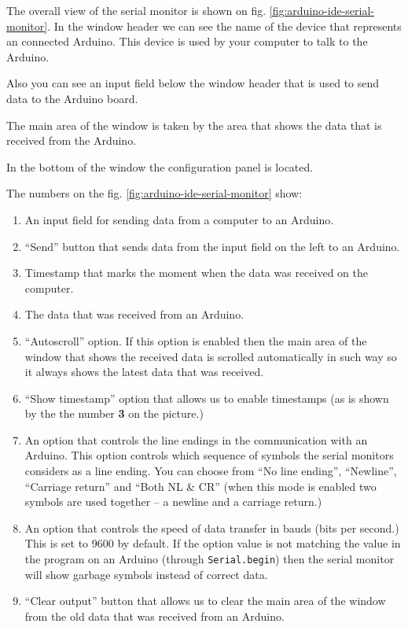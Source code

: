 \documentclass[../sparc.tex]{subfiles}
\begin{document}
The overall view of the serial monitor is shown on fig.
\ref{fig:arduino-ide-serial-monitor}.  In the window header we can see the name
of the device that represents an connected Arduino.  This device is used by your
computer to talk to the Arduino.

Also you can see an input field below the window header that is used to send
data to the Arduino board.

The main area of the window is taken by the area that shows the data that is
received from the Arduino.

In the bottom of the window the configuration panel is located.

The numbers on the fig. \ref{fig:arduino-ide-serial-monitor} show:
\begin{enumerate}
\item An input field for sending data from a computer to an Arduino.
\item ``Send'' button that sends data from the input field on the left to an
  Arduino.
\item Timestamp that marks the moment when the data was received on the
  computer.
\item The data that was received from an Arduino.
\item ``Autoscroll'' option.  If this option is enabled then the main area of
  the window that shows the received data is scrolled automatically in such way
  so it always shows the latest data that was received.
\item ``Show timestamp'' option that allows us to enable timestamps (as is shown
  by the the number \textbf{3} on the picture.)
\item An option that controls the line endings in the communication with an
  Arduino.  This option controls which sequence of symbols the serial monitors
  considers as a line ending.  You can choose from ``No line ending'',
  ``Newline'', ``Carriage return'' and ``Both NL \& CR'' (when this mode is
  enabled two symbols are used together -- a newline and a carriage return.)
\item An option that controls the speed of data transfer in bauds (bits per
  second.)  This is set to 9600 by default.  If the option value is not matching
  the value in the program on an Arduino (through \texttt{Serial.begin}) then
  the serial monitor will show garbage symbols instead of correct data.
\item ``Clear output'' button that allows us to clear the main area of the
  window from the old data that was received from an Arduino.
\end{enumerate}
\end{document}
